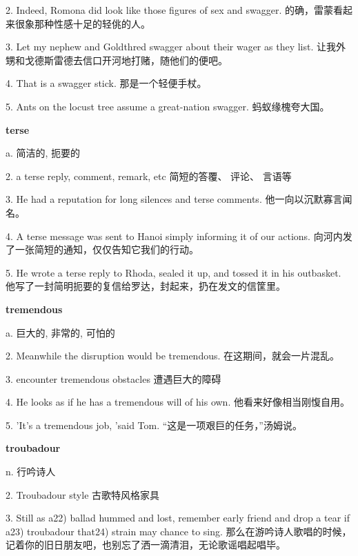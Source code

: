 \documentclass[12pt]{book}
\begin{document}
2.  Indeed, Romona did look like those figures of sex and swagger.  的确，雷蒙看起来很象那种性感十足的轻佻的人。 


3.  Let my nephew and Goldthred swagger about their wager as they list.  让我外甥和戈德斯雷德去信口开河地打赌，随他们的便吧。 


4.  That is a swagger stick.  那是一个轻便手杖。 


5.  Ants on the locust tree assume a great-nation swagger.  蚂蚁缘槐夸大国。 


\vspace{12pt}

\textbf{terse}

a. 简洁的, 扼要的

2.  a terse reply, comment, remark, etc  简短的答覆、 评论、 言语等 


3.  He had a reputation for long silences and terse comments.  他一向以沉默寡言闻名。 


4.  A terse message was sent to Hanoi simply informing it of our actions.  向河内发了一张简短的通知，仅仅告知它我们的行动。 


5.  He wrote a terse reply to Rhoda, sealed it up, and tossed it in his outbasket.  他写了一封简明扼要的复信给罗达，封起来，扔在发文的信筐里。 


\vspace{12pt}

\textbf{tremendous}

a. 巨大的, 非常的, 可怕的

2.  Meanwhile the disruption would be tremendous.  在这期间，就会一片混乱。 


3.  encounter tremendous obstacles  遭遇巨大的障碍 


4.  He looks as if he has a tremendous will of his own.  他看来好像相当刚愎自用。 


5.  'It's a tremendous job, 'said Tom.  “这是一项艰巨的任务，”汤姆说。 


\vspace{12pt}

\textbf{troubadour}

n. 行吟诗人

2.  Troubadour style  古歌特风格家具 


3.  Still as a22) ballad hummed and lost, remember early friend and drop a tear if a23) troubadour that24) strain may chance to sing.  那么在游吟诗人歌唱的时候，记着你的旧日朋友吧，也别忘了洒一滴清泪，无论歌谣唱起唱毕。 


\vspace{12pt}
\end{document}
